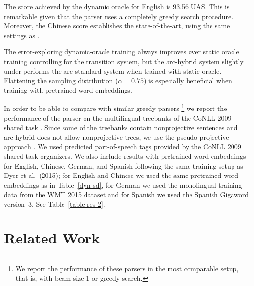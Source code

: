 \documentclass[11pt]{article}
\newcommand{\ignore}[1]{}
\begin{document}
The score achieved by the dynamic oracle for English is 93.56 UAS. This is remarkable given that
the parser uses a completely greedy search procedure. Moreover, the
Chinese score establishes the state-of-the-art, using the same settings as .  

The error-exploring dynamic-oracle training always improves over static oracle training controlling for the transition system, but the arc-hybrid system slightly under-performs
the arc-standard system when trained with static oracle. Flattening the
sampling distribution ($\alpha=0.75$) is
especially beneficial when training with pretrained word embeddings.



In order to be able to compare with similar greedy parsers
\cite{yazdani-henderson:2015:CoNLL,andor-16}\footnote{We report the
  performance of these parsers in the most comparable setup, that is,
  with beam size 1 or greedy search.} we report the performance of
the parser on the multilingual treebanks of the CoNLL 2009 shared task
\cite{conll2009}. Since some of the treebanks contain nonprojective
sentences and arc-hybrid does not allow nonprojective trees, we use
the pseudo-projective approach \cite{nivre05acl}. We used predicted
part-of-speech tags provided by the CoNLL 2009 shared task
organizers. We also include results with pretrained word embeddings
for English, Chinese, German, and Spanish following the same training
setup as Dyer et al.~(2015); for English and Chinese we used the same
pretrained word embeddings as in Table~\ref{dyn-sd}, for German we
used the monolingual training data from the WMT 2015
dataset\ignore{\footnote{\url{http://www.statmt.org/wmt15/translation-task.html}}}
and for Spanish we used the Spanish Gigaword version~3. See Table~\ref{table-res-2}.

\section{Related Work}
\label{sec:related}
\end{document}
